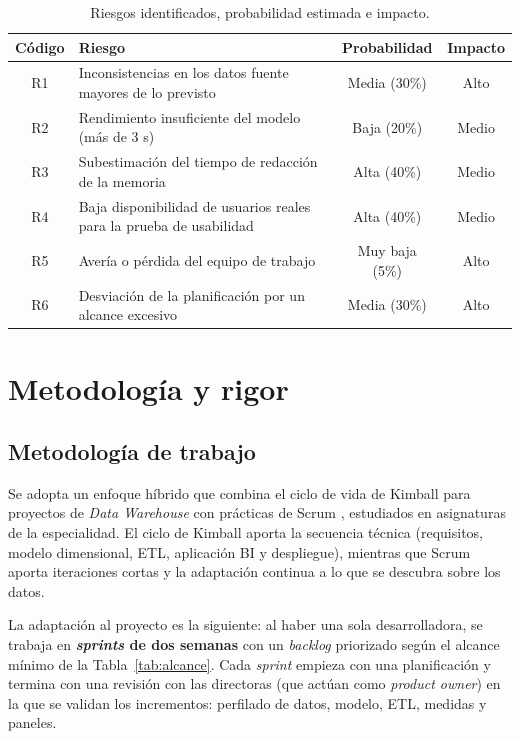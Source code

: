 \documentclass[12pt, a4paper, oneside]{report}
\begin{document}
\begin{table}[H]
\centering
\small
\renewcommand{\arraystretch}{1.1}
\begin{tabularx}{\textwidth}{@{} c X c c @{}}
\toprule
\textbf{Código} & \textbf{Riesgo} & \textbf{Probabilidad} & \textbf{Impacto} \\ \midrule
R1 & Inconsistencias en los datos fuente mayores de lo previsto & Media (30\%) & Alto \\
R2 & Rendimiento insuficiente del modelo (más de 3 s) & Baja (20\%) & Medio \\
R3 & Subestimación del tiempo de redacción de la memoria & Alta (40\%) & Medio \\
R4 & Baja disponibilidad de usuarios reales para la prueba de usabilidad & Alta (40\%) & Medio \\
R5 & Avería o pérdida del equipo de trabajo & Muy baja (5\%) & Alto \\
R6 & Desviación de la planificación por un alcance excesivo & Media (30\%) & Alto \\ \bottomrule
\end{tabularx}
\caption{Riesgos identificados, probabilidad estimada e impacto.}
\label{tab:riesgos}
\end{table}

\chapter{Metodología y rigor}

\section{Metodología de trabajo}
Se adopta un enfoque híbrido que combina el ciclo de vida de Kimball para proyectos de \textit{Data Warehouse} \cite{kimball2008lifecycle} con prácticas de Scrum \cite{schwaber2020scrum}, estudiados en asignaturas de la especialidad. El ciclo de Kimball aporta la secuencia técnica (requisitos, modelo dimensional, ETL, aplicación BI y despliegue), mientras que Scrum aporta iteraciones cortas y la adaptación continua a lo que se descubra sobre los datos.

La adaptación al proyecto es la siguiente: al haber una sola desarrolladora, se trabaja en \textbf{\textit{sprints} de dos semanas} con un \textit{backlog} priorizado según el alcance mínimo de la Tabla~\ref{tab:alcance}. Cada \textit{sprint} empieza con una planificación y termina con una revisión con las directoras (que actúan como \textit{product owner}) en la que se validan los incrementos: perfilado de datos, modelo, ETL, medidas y paneles.
\end{document}
